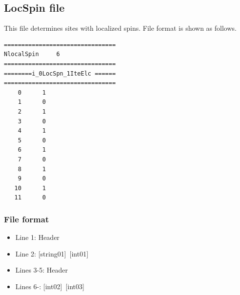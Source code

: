 \newpage
\subsection{LocSpin file}
\label{Subsec:locspn}
This file determines sites with localized spins. File format is shown as follows.\\
\begin{minipage}{10cm}
\begin{screen}
\begin{verbatim}
================================ 
NlocalSpin     6  
================================ 
========i_0LocSpn_1IteElc ====== 
================================ 
    0      1
    1      0
    2      1
    3      0
    4      1
    5      0
    6      1
    7      0
    8      1
    9      0
   10      1
   11      0
\end{verbatim}
\end{screen}
\end{minipage}


\subsubsection{File format}
\begin{itemize}
   \item  Line 1:  Header
   \item  Line 2:   [string01]~[int01]
   \item  Lines 3-5:  Header
   \item  Lines 6-:  [int02]~[int03]
  \end{itemize}
